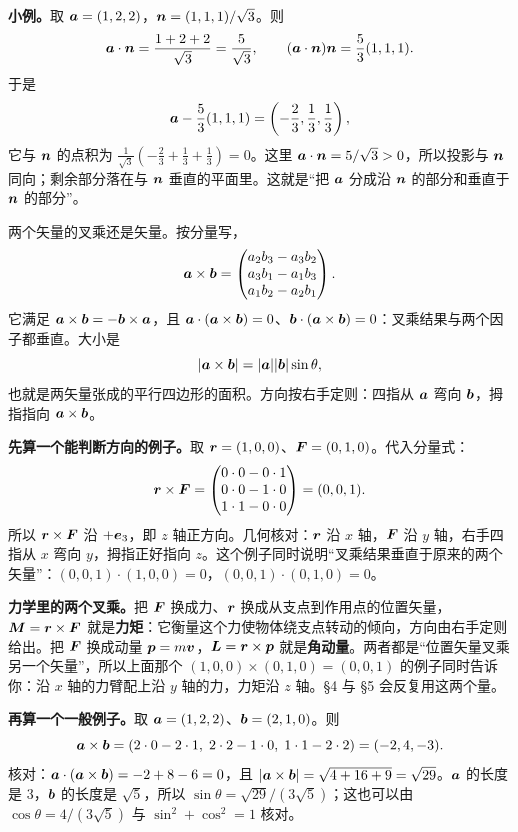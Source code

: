 \documentclass[11pt]{ctexart}
\let\origsubhdr\subhdr
\renewcommand{\subhdr}[1]{\par\needspace{3\baselineskip}\origsubhdr{#1}}
\begin{document}
\textbf{小例。}取 $\boldsymbol{a}=(1,2,2)$，$\boldsymbol{n}=(1,1,1)/\sqrt3$。则
\[
\boldsymbol{a}\cdot\boldsymbol{n}=\frac{1+2+2}{\sqrt3}=\frac{5}{\sqrt3},
\qquad
(\boldsymbol{a}\cdot\boldsymbol{n})\boldsymbol{n}=\frac53(1,1,1).
\]
于是
\[
\boldsymbol{a}-\frac53(1,1,1)=\left(-\frac23,\frac13,\frac13\right),
\]
它与 $\boldsymbol{n}$ 的点积为 $\frac{1}{\sqrt3}(-\frac23+\frac13+\frac13)=0$。这里 $\boldsymbol{a}\cdot\boldsymbol{n}=5/\sqrt3>0$，所以投影与 $\boldsymbol{n}$ 同向；剩余部分落在与 $\boldsymbol{n}$ 垂直的平面里。这就是“把 $\boldsymbol{a}$ 分成沿 $\boldsymbol{n}$ 的部分和垂直于 $\boldsymbol{n}$ 的部分”。

\label{subsec:cross}

两个矢量的叉乘还是矢量。按分量写，
\[
\boldsymbol{a}\times\boldsymbol{b}=
\begin{pmatrix}
a_2b_3-a_3b_2\\
a_3b_1-a_1b_3\\
a_1b_2-a_2b_1
\end{pmatrix}.
\]
它满足 $\boldsymbol{a}\times\boldsymbol{b}=-\boldsymbol{b}\times\boldsymbol{a}$，且 $\boldsymbol{a}\cdot(\boldsymbol{a}\times\boldsymbol{b})=0$、$\boldsymbol{b}\cdot(\boldsymbol{a}\times\boldsymbol{b})=0$：叉乘结果与两个因子都垂直。大小是
\[
|\boldsymbol{a}\times\boldsymbol{b}|=|\boldsymbol{a}||\boldsymbol{b}|\sin\theta,
\]
也就是两矢量张成的平行四边形的面积。方向按右手定则：四指从 $\boldsymbol{a}$ 弯向 $\boldsymbol{b}$，拇指指向 $\boldsymbol{a}\times\boldsymbol{b}$。

\textbf{先算一个能判断方向的例子。}取 $\boldsymbol{r}=(1,0,0)$、$\boldsymbol{F}=(0,1,0)$。代入分量式：
\[
\boldsymbol{r}\times\boldsymbol{F}=
\begin{pmatrix}
0\cdot0-0\cdot1\\
0\cdot0-1\cdot0\\
1\cdot1-0\cdot0
\end{pmatrix}
=(0,0,1).
\]
所以 $\boldsymbol{r}\times\boldsymbol{F}$ 沿 $+\boldsymbol{e}_3$，即 $z$ 轴正方向。几何核对：$\boldsymbol{r}$ 沿 $x$ 轴，$\boldsymbol{F}$ 沿 $y$ 轴，右手四指从 $x$ 弯向 $y$，拇指正好指向 $z$。这个例子同时说明“叉乘结果垂直于原来的两个矢量”：$(0,0,1)\cdot(1,0,0)=0$，$(0,0,1)\cdot(0,1,0)=0$。

\textbf{力学里的两个叉乘。}把 $\boldsymbol{F}$ 换成力、$\boldsymbol{r}$ 换成从支点到作用点的位置矢量，$\boldsymbol{M}=\boldsymbol{r}\times\boldsymbol{F}$ 就是\textbf{力矩}：它衡量这个力使物体绕支点转动的倾向，方向由右手定则给出。把 $\boldsymbol{F}$ 换成动量 $\boldsymbol{p}=m\boldsymbol{v}$，$\boldsymbol{L}=\boldsymbol{r}\times\boldsymbol{p}$ 就是\textbf{角动量}。两者都是“位置矢量叉乘另一个矢量”，所以上面那个 $(1,0,0)\times(0,1,0)=(0,0,1)$ 的例子同时告诉你：沿 $x$ 轴的力臂配上沿 $y$ 轴的力，力矩沿 $z$ 轴。\S4 与 \S5 会反复用这两个量。

\textbf{再算一个一般例子。}取 $\boldsymbol{a}=(1,2,2)$、$\boldsymbol{b}=(2,1,0)$。则
\[
\boldsymbol{a}\times\boldsymbol{b}=(2\cdot0-2\cdot1,\;2\cdot2-1\cdot0,\;1\cdot1-2\cdot2)=(-2,4,-3).
\]
核对：$\boldsymbol{a}\cdot(\boldsymbol{a}\times\boldsymbol{b})=-2+8-6=0$，且 $|\boldsymbol{a}\times\boldsymbol{b}|=\sqrt{4+16+9}=\sqrt{29}$。$\boldsymbol{a}$ 的长度是 $3$，$\boldsymbol{b}$ 的长度是 $\sqrt5$，所以 $\sin\theta=\sqrt{29}/(3\sqrt5)$；这也可以由 $\cos\theta=4/(3\sqrt5)$ 与 $\sin^2+\cos^2=1$ 核对。
\end{document}
